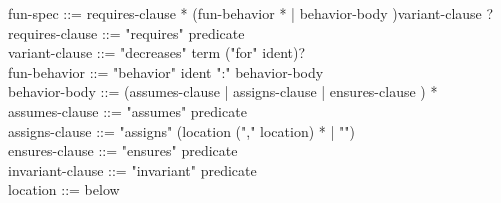 \begin{syntax}
  fun-spec ::= requires-clause * (fun-behavior * | behavior-body )variant-clause ? \\
  requires-clause ::= "requires" predicate \\
  variant-clause ::= "decreases" term ("for" ident)? \\
  fun-behavior ::= "behavior" ident ":" behavior-body \\
  behavior-body ::= (assumes-clause | assigns-clause |
              ensures-clause ) * \\
  assumes-clause ::= "assumes" predicate \\
  assigns-clause ::= "assigns" (location ("," location) * |
  "\nothing") \\
  ensures-clause ::= "ensures" predicate \\
  invariant-clause ::= "invariant" predicate \\
  location ::= below
\end{syntax}
